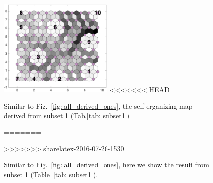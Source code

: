 \begin{figure}
        \centering
        \includegraphics[width=0.5\textwidth]{../../images0.01/M31/2D/image_subsets/subset1_dist_with_hits_t.png}
<<<<<<< HEAD
    \caption{Similar to Fig.~\ref{fig: all_derived_ones}, the self-organizing map derived from subset 1 (Tab.\ref{tab: subset1})}
=======
    \caption{Similar to Fig.~\ref{fig: all_derived_ones}, here we show the result from subset 1 (Table~\ref{tab: subset1}).}
>>>>>>> sharelatex-2016-07-26-1530
    \label{fig: subset1}
\end{figure}